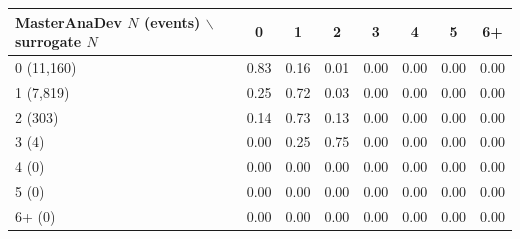 \begin{tabular}{lccccccc}
\toprule
MasterAnaDev $N$ (events) $\backslash$ surrogate $N$ & 0 & 1 & 2 & 3 & 4 & 5 & 6+ \\
\midrule
0 (11,160) & 0.83 & 0.16 & 0.01 & 0.00 & 0.00 & 0.00 & 0.00 \\
1 (7,819) & 0.25 & 0.72 & 0.03 & 0.00 & 0.00 & 0.00 & 0.00 \\
2 (303) & 0.14 & 0.73 & 0.13 & 0.00 & 0.00 & 0.00 & 0.00 \\
3 (4) & 0.00 & 0.25 & 0.75 & 0.00 & 0.00 & 0.00 & 0.00 \\
4 (0) & 0.00 & 0.00 & 0.00 & 0.00 & 0.00 & 0.00 & 0.00 \\
5 (0) & 0.00 & 0.00 & 0.00 & 0.00 & 0.00 & 0.00 & 0.00 \\
6+ (0) & 0.00 & 0.00 & 0.00 & 0.00 & 0.00 & 0.00 & 0.00 \\
\bottomrule
\end{tabular}
